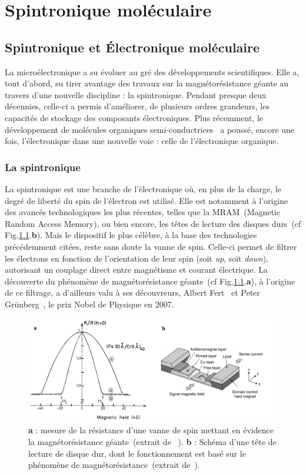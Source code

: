 \chapter{Spintronique moléculaire}

\section{Spintronique et Électronique moléculaire}
La microélectronique a su évoluer au gré des développements scientifiques. Elle a, tout d'abord, su tirer avantage des travaux sur la magnétorésistance géante au travers d'une nouvelle discipline : la spintronique. Pendant presque deux décennies, celle-ci a permis d'améliorer, de plusieurs ordres grandeurs, les capacités de stockage des composants électroniques. Plus récemment, le développement de molécules organiques semi-conductrices~\cite{Tsumura1986,Horowitz1990,Lin1997} a poussé, encore une fois, l'électronique dans une nouvelle voie : celle de l'électronique organique.

\subsection{La spintronique}
La spintronique est une branche de l'électronique où, en plus de la charge, le degré de liberté du spin de l'électron est utilisé. Elle est notamment à l'origine des avancés technologiques les plus récentes, telles que la MRAM~(Magnetic Random Access Memory), ou bien encore, les têtes de lecture des disques durs~(cf Fig.\ref{SpinValve}.\textbf{b}). Mais le dispositif le plus célèbre, à la base des technologies précédemment citées, reste sans doute la vanne de spin. Celle-ci permet de filtrer les électrons en fonction de l'orientation de leur spin (soit \textit{up}, soit \textit{down}), autorisant un couplage direct entre magnétisme et courant électrique. La découverte du phénomène de magnétorésistance géante~(cf Fig.\ref{SpinValve}.\textbf{a}), à l'origine de ce filtrage, a d'ailleurs valu à ses découvreurs, Albert Fert~\cite{Baibich1988} et Peter Grünberg~\cite{Gruenberg1986}, le prix Nobel de Physique en 2007.

\begin{figure}
\centering \includegraphics[scale=0.45]{Spintronique/SpinValve/SpinValve.pdf}
\caption{\textbf{a} : mesure de la résistance d'une vanne de spin mettant en évidence la magnétorésistance géante~(extrait de ~\cite{Baibich1988}).  \textbf{b} : Schéma d'une tête de lecture de disque dur, dont le fonctionnement est basé sur le phénomène de magnétorésistance~(extrait de~\cite{Hitoshi2001}).}
\label{SpinValve}
\end{figure}



